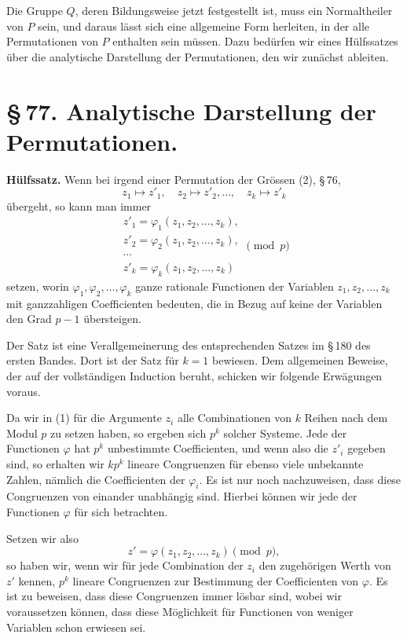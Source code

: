 \documentclass[11pt]{article}
\begin{document}
Die Gruppe $Q$, deren Bildungsweise jetzt festgestellt ist, muss ein Normaltheiler von $P$ sein, und daraus lässt sich eine allgemeine Form herleiten, in der alle Permutationen von $P$ enthalten sein müssen. Dazu bedürfen wir eines Hülfssatzes über die analytische Darstellung der Permutationen, den wir zunächst ableiten.

\section*{\S\,77. Analytische Darstellung der Permutationen.}

\textbf{Hülfssatz.} Wenn bei irgend einer Permutation der Grössen (2), \S\,76,
\[
 z_1\mapsto z'_1,\quad z_2\mapsto z'_2,\ldots,\quad z_k\mapsto z'_k
\]
übergeht, so kann man immer
\begin{equation}
\begin{gathered}
 z'_1=\varphi_1(z_1,z_2,\ldots,z_k),\\
 z'_2=\varphi_2(z_1,z_2,\ldots,z_k),\\
 \cdots\\
 z'_k=\varphi_k(z_1,z_2,\ldots,z_k)
\end{gathered}
 \pmod p
 \tag{1}
\end{equation}
setzen, worin $\varphi_1,\varphi_2,\ldots,\varphi_k$ ganze rationale Functionen der Variablen $z_1,z_2,\ldots,z_k$ mit ganzzahligen Coefficienten bedeuten, die in Bezug auf keine der Variablen den Grad $p-1$ übersteigen.

Der Satz ist eine Verallgemeinerung des entsprechenden Satzes im \S\,180 des ersten Bandes. Dort ist der Satz für $k=1$ bewiesen. Dem allgemeinen Beweise, der auf der vollständigen Induction beruht, schicken wir folgende Erwägungen voraus.

Da wir in (1) für die Argumente $z_i$ alle Combinationen von $k$ Reihen nach dem Modul $p$ zu setzen haben, so ergeben sich $p^k$ solcher Systeme. Jede der Functionen $\varphi$ hat $p^k$ unbestimmte Coefficienten, und wenn also die $z'_i$ gegeben sind, so erhalten wir $kp^k$ lineare Congruenzen für ebenso viele unbekannte Zahlen, nämlich die Coefficienten der $\varphi_i$. Es ist nur noch nachzuweisen, dass diese Congruenzen von einander unabhängig sind. Hierbei können wir jede der Functionen $\varphi$ für sich betrachten.

Setzen wir also
\begin{equation}
 z'=\varphi(z_1,z_2,\ldots,z_k)\pmod p,
 \tag{2}
\end{equation}
so haben wir, wenn wir für jede Combination der $z_i$ den zugehörigen Werth von $z'$ kennen, $p^k$ lineare Congruenzen zur Bestimmung der Coefficienten von $\varphi$. Es ist zu beweisen, dass diese Congruenzen immer lösbar sind, wobei wir voraussetzen können, dass diese Möglichkeit für Functionen von weniger Variablen schon erwiesen sei.
\end{document}
